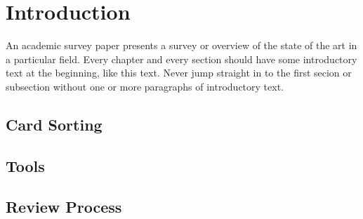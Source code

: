 \chapter{Introduction}

\label{chap:Intro}



An academic survey paper presents a survey or overview of the state of
the art in a particular field. Every chapter and every section should
have some introductory text at the beginning, like this text. Never
jump straight in to the first secion or subsection without one or more
paragraphs of introductory text.






\section{Card Sorting}

\section{Tools}

\section{Review Process}